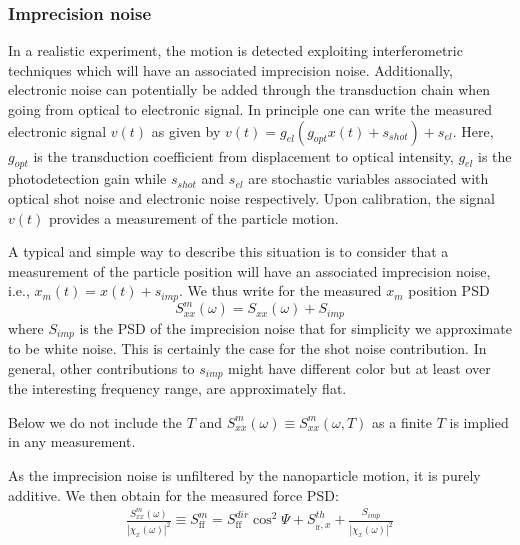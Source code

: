 \documentclass[twocolumn,english,notitlepage,superscriptaddress,nofootinbib]{revtex4-2}
\begin{document}
 \subsubsection{Imprecision noise}


In a realistic experiment, the motion is detected exploiting interferometric techniques which will have an associated imprecision noise. Additionally, electronic noise can potentially be added through the transduction chain when going from optical to electronic signal. In principle one can write the measured electronic signal $v(t)$ as given by $v(t)=g_{el} (g_{opt} x(t)+s_{shot})+s_{el}$. Here, $g_{opt}$ is the transduction coefficient from displacement to optical intensity, $g_{el}$ is the photodetection gain while $s_{shot}$ and $s_{el}$ are stochastic variables associated with optical shot noise and electronic noise respectively. Upon calibration, the signal $v(t)$ provides a measurement of the particle motion. 

A typical and simple way to describe this situation is to consider that a measurement of the particle position will have an associated imprecision noise, i.e., $x_m(t)=x(t)+s_{imp}$. We thus write for the measured $x_m$ position PSD
\begin{equation}
 S^{m}_{xx}(\omega) =  S_{xx}(\omega)+ S_{imp}
\end{equation}
where $S_{imp}$ is the PSD of the imprecision noise that for simplicity we approximate to be white noise.  
This is certainly the case for the shot noise contribution. In general, other contributions to $s_{imp}$ might have different color but at least over the interesting frequency range, are approximately flat.

Below we do not include the $T$ and $S^{m}_{xx}(\omega)\equiv S^{m}_{xx}(\omega,T)$ as a finite $T$ is implied in any measurement.





As the imprecision noise is unfiltered by the nanoparticle motion,  it is purely additive. We then obtain for the measured force PSD:
\begin{eqnarray}
  \frac{S^{m}_{xx}(\omega)} { |\chi_x(\omega)|^2}   \equiv   S^{m}_{\text{ff}}   =   S^{dir}_{\text{ff}}\cos^2 \Psi + S^{th}_{_{\text{ff}},x}+ \frac{S_{imp}}  { |\chi_x(\omega)|^2}
 \label{Forcexx}
\end{eqnarray}
\end{document}
